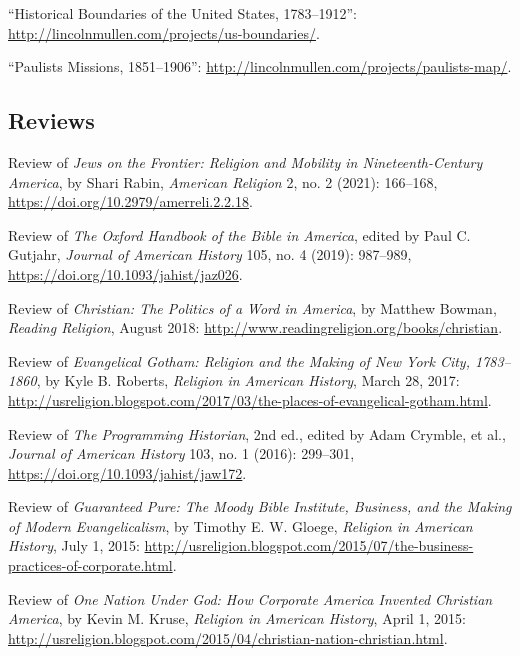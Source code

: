 \documentclass[11pt]{article}
\begin{document}
``Historical Boundaries of the United States, 1783--1912'': \url{http://lincolnmullen.com/projects/us-boundaries/}.

``Paulists Missions, 1851--1906'': \url{http://lincolnmullen.com/projects/paulists-map/}.


\subsection{Reviews}\label{Reviews}

Review of \emph{Jews on the Frontier: Religion and Mobility in Nineteenth-Century America}, by Shari Rabin, \emph{American Religion} 2, no. 2 (2021): 166--168, \url{https://doi.org/10.2979/amerreli.2.2.18}.

Review of \emph{The Oxford Handbook of the Bible in America}, edited by Paul C. Gutjahr, \emph{Journal of American History} 105, no. 4 (2019): 987--989, \url{https://doi.org/10.1093/jahist/jaz026}.

Review of \emph{Christian: The Politics of a Word in America}, by Matthew Bowman, \emph{Reading Religion}, August 2018: 
\url{http://www.readingreligion.org/books/christian}.

Review of \emph{Evangelical Gotham: Religion and the Making of New York City, 1783--1860}, by Kyle B. Roberts, \emph{Religion in American History}, March 28, 2017: \url{http://usreligion.blogspot.com/2017/03/the-places-of-evangelical-gotham.html}.

Review of \emph{The Programming Historian}, 2nd ed., edited by
Adam Crymble, et al., \emph{Journal of American History} 103, no. 1 (2016): 
299--301, \url{https://doi.org/10.1093/jahist/jaw172}.

Review of \emph{Guaranteed Pure: The Moody Bible Institute, Business, and the Making of Modern Evangelicalism}, by Timothy E. W. Gloege, \emph{Religion in American History}, July 1, 2015: \url{http://usreligion.blogspot.com/2015/07/the-business-practices-of-corporate.html}.

Review of \emph{One Nation Under God: How Corporate America Invented Christian America}, by Kevin M. Kruse, \emph{Religion in American History}, April 1, 2015: \url{http://usreligion.blogspot.com/2015/04/christian-nation-christian.html}.

\end{document}
